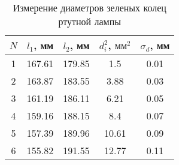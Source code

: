 \begin{table}[h]
			\begin{center}
				\begin{tabular}{|c|c|c|c|c|}
					\hline
          $ N $ & $ l_1 $, мм & $ l_2 $, мм & $ d_i^2 $, $ \text{мм}^2 $ & $ \sigma_d $, мм\\ 
					\hline
					1 & 167.61 & 179.85 & 1.5 & 0.01 \\\hline
					2 & 163.87 & 183.55 & 3.88 & 0.03 \\\hline
					3 & 161.19 & 186.11 & 6.21 & 0.05 \\\hline
					4 & 159.16 & 188.15 & 8.4 & 0.07 \\\hline
					5 & 157.39 & 189.96 & 10.61 & 0.09 \\\hline
					6 & 155.82 & 191.55 & 12.77 & 0.11 \\
					\hline
				\end{tabular}
			\end{center}
			\caption{Измерение диаметров зеленых колец ртутной лампы}
			\label{Gr_table}
\end{table}
